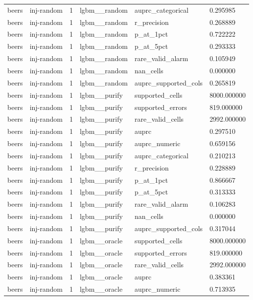 \begin{tabular}{llllll}
beers & inj-random & 1 & lgbm\_\_random & auprc\_categorical & 0.295985 \\
beers & inj-random & 1 & lgbm\_\_random & r\_precision & 0.268889 \\
beers & inj-random & 1 & lgbm\_\_random & p\_at\_1pct & 0.722222 \\
beers & inj-random & 1 & lgbm\_\_random & p\_at\_5pct & 0.293333 \\
beers & inj-random & 1 & lgbm\_\_random & rare\_valid\_alarm & 0.105949 \\
beers & inj-random & 1 & lgbm\_\_random & nan\_cells & 0.000000 \\
beers & inj-random & 1 & lgbm\_\_random & auprc\_supported\_cols & 0.265819 \\
beers & inj-random & 1 & lgbm\_\_purify & supported\_cells & 8000.000000 \\
beers & inj-random & 1 & lgbm\_\_purify & supported\_errors & 819.000000 \\
beers & inj-random & 1 & lgbm\_\_purify & rare\_valid\_cells & 2992.000000 \\
beers & inj-random & 1 & lgbm\_\_purify & auprc & 0.297510 \\
beers & inj-random & 1 & lgbm\_\_purify & auprc\_numeric & 0.659156 \\
beers & inj-random & 1 & lgbm\_\_purify & auprc\_categorical & 0.210213 \\
beers & inj-random & 1 & lgbm\_\_purify & r\_precision & 0.228889 \\
beers & inj-random & 1 & lgbm\_\_purify & p\_at\_1pct & 0.866667 \\
beers & inj-random & 1 & lgbm\_\_purify & p\_at\_5pct & 0.313333 \\
beers & inj-random & 1 & lgbm\_\_purify & rare\_valid\_alarm & 0.106283 \\
beers & inj-random & 1 & lgbm\_\_purify & nan\_cells & 0.000000 \\
beers & inj-random & 1 & lgbm\_\_purify & auprc\_supported\_cols & 0.317044 \\
beers & inj-random & 1 & lgbm\_\_oracle & supported\_cells & 8000.000000 \\
beers & inj-random & 1 & lgbm\_\_oracle & supported\_errors & 819.000000 \\
beers & inj-random & 1 & lgbm\_\_oracle & rare\_valid\_cells & 2992.000000 \\
beers & inj-random & 1 & lgbm\_\_oracle & auprc & 0.383361 \\
beers & inj-random & 1 & lgbm\_\_oracle & auprc\_numeric & 0.713935 \\

\end{tabular}
